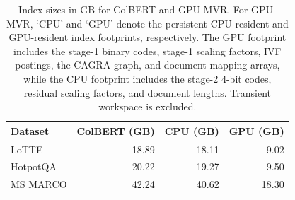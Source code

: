 \begin{table}[t]
    \centering
    \small
\begin{tabular}{lrrr}
        \toprule
        Dataset & ColBERT (GB) & CPU (GB) & GPU (GB) \\
        \midrule
        LoTTE    & 18.89 & 18.11 & 9.02 \\
        HotpotQA & 20.22 & 19.27 & 9.50 \\
        MS MARCO & 42.24 & 40.62 & 18.30 \\
        \bottomrule
    \end{tabular}
    \caption{Index sizes in GB for ColBERT and GPU-MVR. For GPU-MVR, `CPU' and `GPU' denote the persistent CPU-resident and GPU-resident index footprints, respectively. The GPU footprint includes the stage-1 binary codes, stage-1 scaling factors, IVF postings, the CAGRA graph, and document-mapping arrays, while the CPU footprint includes the stage-2 4-bit codes, residual scaling factors, and document lengths. Transient workspace is excluded.}
    \label{tab:index-sizes}
\end{table}
